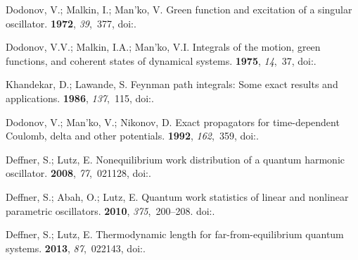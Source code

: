 \documentclass[preprints,article,accept,moreauthors,pdftex]{Definitions/mdpi}
\begin{document}
\begin{thebibliography}{999}
Dodonov, V.; Malkin, I.; Man'ko, V.
\newblock Green function and excitation of a singular oscillator.
 {\bf 1972}, {\em 39},~377,
\newblock
  doi:{\href{https://doi.org/10.1016/0375-9601(72)90102-8}{}}.

Dodonov, V.V.; Malkin, I.A.; Man'ko, V.I.
\newblock Integrals of the motion, green functions, and coherent states of
  dynamical systems.
 {\bf 1975}, {\em 14},~37,
\newblock
  doi:{\href{https://doi.org/10.1007/BF01807990}{}}.

Khandekar, D.; Lawande, S.
\newblock Feynman path integrals: Some exact results and applications.
 {\bf 1986}, {\em 137},~115,
\newblock
  doi:{\href{https://doi.org/10.1016/0370-1573(86)90029-3}{}}.

Dodonov, V.; Man'ko, V.; Nikonov, D.
\newblock Exact propagators for time-dependent {C}oulomb, delta and other
  potentials.
 {\bf 1992}, {\em 162},~359,
\newblock
  doi:{\href{https://doi.org/10.1016/0375-9601(92)90054-P}{}}.

Deffner, S.; Lutz, E.
\newblock Nonequilibrium work distribution of a quantum harmonic oscillator.
 {\bf 2008}, {\em 77},~021128,
\newblock
  doi:{\href{https://doi.org/10.1103/PhysRevE.77.021128}{}}.

Deffner, S.; Abah, O.; Lutz, E.
\newblock Quantum work statistics of linear and nonlinear parametric
  oscillators.
 {\bf 2010}, {\em 375},~200--208.
  doi:{\href{https://doi.org/10.1016/j.chemphys.2010.04.042}{}}.

Deffner, S.; Lutz, E.
\newblock Thermodynamic length for far-from-equilibrium quantum systems.
 {\bf 2013}, {\em 87},~022143,
\newblock
  doi:{\href{https://doi.org/10.1103/PhysRevE.87.022143}{}}.


\end{thebibliography}
\end{document}
